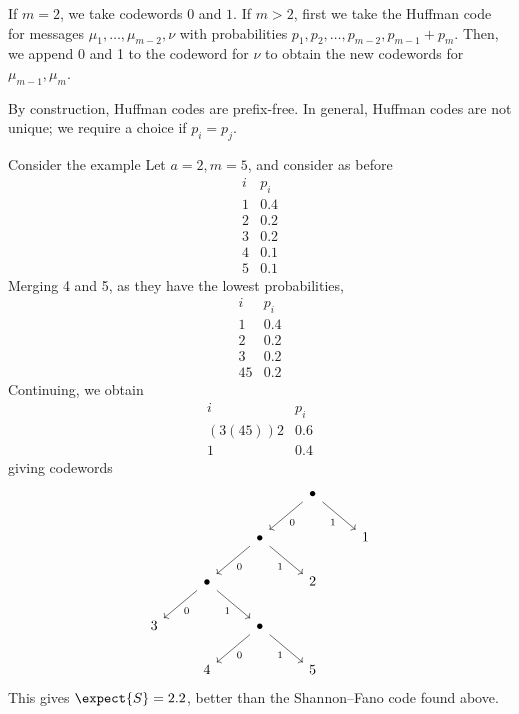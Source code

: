 If $m = 2$, we take codewords $0$ and $1$.
If $m > 2$, first we take the Huffman code for messages $\mu_1, \dots, \mu_{m-2}, \nu$ with probabilities $p_1, p_2, \dots, p_{m-2}, p_{m-1} + p_m$.
Then, we append 0 and 1 to the codeword for $\nu$ to obtain the new codewords for $\mu_{m-1}, \mu_m$.
\begin{remark}
    By construction, Huffman codes are prefix-free.
    In general, Huffman codes are not unique; we require a choice if $p_i = p_j$.
\end{remark}
\begin{example}
    Consider the example
    Let $a = 2, m = 5$, and consider as before
    \[ \begin{array}{cc}
            i & p_i \\
            1 & 0.4 \\
            2 & 0.2 \\
            3 & 0.2 \\
            4 & 0.1 \\
            5 & 0.1
    \end{array} \]
    Merging 4 and 5, as they have the lowest probabilities,
    \[ \begin{array}{cc}
        i & p_i \\
        1 & 0.4 \\
        2 & 0.2 \\
        3 & 0.2 \\
        45 & 0.2
    \end{array} \]
    Continuing, we obtain
    \[ \begin{array}{cc}
        i & p_i \\
        (3(45))2 & 0.6 \\
        1 & 0.4
    \end{array} \]
    giving codewords
    \[\begin{tikzcd}
        &&& \bullet \\
        && \bullet && 1 \\
        & \bullet && 2 \\
        3 && \bullet \\
        & 4 && 5
        \arrow["0", from=3-2, to=4-1]
        \arrow["1"', from=3-2, to=4-3]
        \arrow["0", from=4-3, to=5-2]
        \arrow["1"', from=4-3, to=5-4]
        \arrow["0", from=2-3, to=3-2]
        \arrow["1"', from=2-3, to=3-4]
        \arrow["0", from=1-4, to=2-3]
        \arrow["1"', from=1-4, to=2-5]
    \end{tikzcd}\]
    This gives $\expect{S} = 2.2$, better than the Shannon--Fano code found above.
\end{example}
